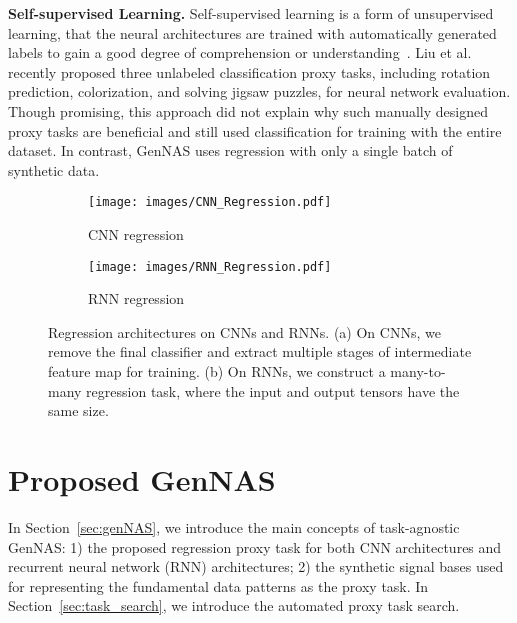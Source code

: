 \documentclass{article}
\begin{document}
\textbf{Self-supervised Learning.}
Self-supervised learning is a form of unsupervised learning, that the neural architectures are trained with automatically generated labels to gain a good degree of comprehension or understanding~\cite{jing2020self,dosovitskiy2014discriminative,doersch2015unsupervised,wang2015unsupervised, liu2020labels}.
Liu et al.~\cite{liu2020labels} recently proposed three unlabeled classification proxy tasks, including rotation prediction, colorization, and solving jigsaw puzzles, for neural network evaluation.
Though promising, this approach did not explain why such manually designed proxy tasks are beneficial and still used classification for training with the entire dataset.
In contrast, GenNAS uses regression with only a single batch of synthetic data.

\begin{figure}
\centering
     \begin{subfigure}[b]{0.58\textwidth}
         \centering
         \texttt{[image: images/CNN\_Regression.pdf]}
         \caption{CNN regression}
         \label{fig:StructureA}
     \end{subfigure}
\begin{subfigure}[b]{0.41\textwidth}
         \centering
         \texttt{[image: images/RNN\_Regression.pdf]}
         \caption{RNN regression}
         \label{fig:StructureB}
     \end{subfigure}
        \caption{Regression architectures on CNNs and RNNs. (a) On CNNs, we remove the final classifier and extract multiple stages of intermediate feature map for training. (b) On RNNs, we construct a many-to-many regression task, where the input and output tensors have the same size.}
        \label{fig:regression}
     \vspace{-8pt}
\end{figure}

\section{Proposed GenNAS}
In Section~\ref{sec:genNAS}, we introduce the main concepts of task-agnostic GenNAS: 1) the proposed regression proxy task for both CNN architectures and recurrent neural network (RNN) architectures; 2) the synthetic signal bases used for representing the fundamental data patterns as the proxy task.
In Section~\ref{sec:task_search}, we introduce the automated proxy task search.

\vspace{-4pt}
\end{document}
